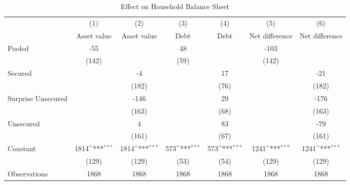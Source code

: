 \begin{table}[htbp]\centering
\def\sym#1{\ifmmode^{#1}\else\(^{#1}\)\fi}
\caption{Effect on Household Balance Sheet\label{assetsbal99\_lvl\_ITT\_v2}}
\begin{tabular}{l*{6}{c}}
\toprule
                    &\multicolumn{1}{c}{(1)}&\multicolumn{1}{c}{(2)}&\multicolumn{1}{c}{(3)}&\multicolumn{1}{c}{(4)}&\multicolumn{1}{c}{(5)}&\multicolumn{1}{c}{(6)}\\
                    &\multicolumn{1}{c}{Asset value}&\multicolumn{1}{c}{Asset value}&\multicolumn{1}{c}{Debt}&\multicolumn{1}{c}{Debt}&\multicolumn{1}{c}{Net difference}&\multicolumn{1}{c}{Net difference}\\
\midrule
Pooled              &         -55         &                     &          48         &                     &        -103         &                     \\
                    &       (142)         &                     &        (59)         &                     &       (142)         &                     \\\addlinespace
Secured             &                     &          -4         &                     &          17         &                     &         -21         \\
                    &                     &       (182)         &                     &        (76)         &                     &       (182)         \\\addlinespace
Surprise Unsecured  &                     &        -146         &                     &          29         &                     &        -176         \\
                    &                     &       (163)         &                     &        (68)         &                     &       (163)         \\\addlinespace
Unsecured           &                     &           4         &                     &          83         &                     &         -79         \\
                    &                     &       (161)         &                     &        (67)         &                     &       (161)         \\\addlinespace
Constant            &        1814\sym{***}&        1814\sym{***}&         573\sym{***}&         573\sym{***}&        1241\sym{***}&        1241\sym{***}\\
                    &       (129)         &       (129)         &        (53)         &        (54)         &       (129)         &       (129)         \\
\midrule
Observations        &        1868         &        1868         &        1868         &        1868         &        1868         &        1868         \\
\bottomrule
\end{tabular}
\end{table}
